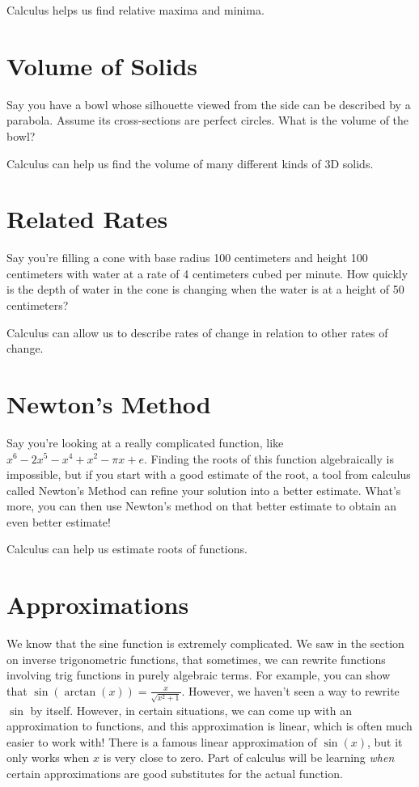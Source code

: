 \documentclass{ximera}
\begin{document}
Calculus helps us find relative maxima and minima.

\section{Volume of Solids}
Say you have a bowl whose silhouette viewed from the side can be described by a parabola. Assume its cross-sections are perfect circles. What is the volume of the bowl? 

Calculus can help us find the volume of many different kinds of 3D solids. 

\section{Related Rates}
Say you're filling a cone with base radius 100 centimeters and height 100 centimeters with water at a rate of 4 centimeters cubed per minute. How quickly is the depth of water in the cone is changing when the water is at a height of 50 centimeters? 

Calculus can allow us to describe rates of change in relation to other rates of change. 

\section{Newton's Method}
Say you're looking at a really complicated function, like $x^6 - 2x^5 - x^4 + x^2 - \pi x + e$. Finding the roots of this function algebraically is impossible, but if you start with a good estimate of the root, a tool from calculus called Newton's Method can refine your solution into a better estimate. What's more, you can then use Newton's method on that better estimate to obtain an even better estimate!

Calculus can help us estimate roots of functions. 

\section{Approximations}
We know that the sine function is extremely complicated. We saw in the section on inverse trigonometric functions, that sometimes, we can rewrite functions involving trig functions in purely algebraic terms. For example, you can show that $\sin(\arctan(x)) = \frac{x}{\sqrt{x^2 + 1}}$. However, we haven't seen a way to rewrite $\sin$ by itself. However, in certain situations, we can come up with an approximation to functions, and this approximation is linear, which is often much easier to work with! There is a famous linear approximation of $\sin(x)$, but it only works when $x$ is very close to zero. Part of calculus will be learning \emph{when} certain approximations are good substitutes for the actual function.
\end{document}
